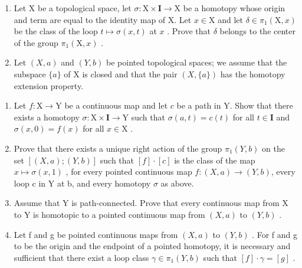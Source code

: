 \exercisegroup

\begin{enumerate}
\def\labelenumi{\arabic{enumi})}
\item
  Let X be a topological space, let \(\sigma: \mathrm{X} \times \mathbf{I} \to \mathrm{X}\) be a homotopy whose origin and term are equal to the identity map of X. Let \(x \in \mathrm{X}\) and let \(\delta \in \pi_1(\mathrm{X}, x)\) be the class of the loop \(t \mapsto \sigma(x, t)\) at \(x\) . Prove that \(\delta\) belongs to the center of the group \(\pi_1(\mathrm{X}, x)\) .
\item
  Let \((X, a)\) and \((Y, b)\) be pointed topological spaces; we assume that the subspace \(\{a\}\) of X is closed and that the pair \((X, \{a\})\) has the homotopy extension property.
\end{enumerate}

\begin{enumerate}
\def\labelenumi{\alph{enumi})}
\item
  Let \(f \colon \mathrm{X} \to \mathrm{Y}\) be a continuous map and let \(c\) be a path in Y. Show that there exists a homotopy \(\sigma \colon \mathrm{X} \times \mathbf{I} \to \mathrm{Y}\) such that \(\sigma(a, t) = c(t)\) for all \(t \in \mathbf{I}\) and \(\sigma(x, 0) = f(x)\) for all \(x \in \mathrm{X}\) .
\item
  Prove that there exists a unique right action of the group \(\pi_{1}(Y,b)\) on the set \([(X,a);(Y,b)]\) such that \([f]\cdot[c]\) is the class of the map \(x\mapsto\sigma(x,1)\) , for every pointed continuous map \(f\colon(X,a)\to(Y,b)\), every loop c in Y at b, and every homotopy \(\sigma\) as above.
\item
  Assume that Y is path-connected. Prove that every continuous map from X to Y is homotopic to a pointed continuous map from \((X, a)\) to \((Y, b)\) .
\item
  Let f and g be pointed continuous maps from \((X, a)\) to \((Y, b)\) . For f and g to be the origin and the endpoint of a pointed homotopy, it is necessary and sufficient that there exist a loop class \(\gamma \in \pi_{1}(Y, b)\) such that \([f] \cdot \gamma = [g]\) .
\end{enumerate}

